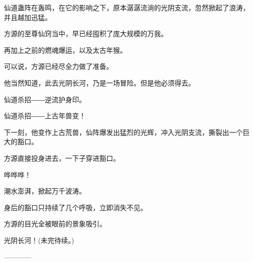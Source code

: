 \begin{this_body}
仙道蛊阵在轰鸣，在它的影响之下，原本潺潺流淌的光阴支流，忽然掀起了浪涛，并且越加迅猛。

方源的至尊仙窍当中，早已经囤积了庞大规模的万我。

再加上之前的燃魂爆运，以及太古年猴。

可以说，方源已经尽全力做了准备。

他当然知道，此去光阴长河，乃是一场冒险。但是他必须得去。

仙道杀招――逆流护身印。

仙道杀招――上古年兽变！

下一刻，他变作上古荒兽，仙阵爆发出猛烈的光辉，冲入光阴支流，撕裂出一个巨大的豁口。

方源直接投身进去，一下子穿进豁口。

哗哗哗！

潮水澎湃，掀起万千波涛。

身后的豁口只持续了几个呼吸，立即消失不见。

方源的目光全被眼前的景象吸引。

光阴长河！(未完待续。)

------------

\end{this_body}

